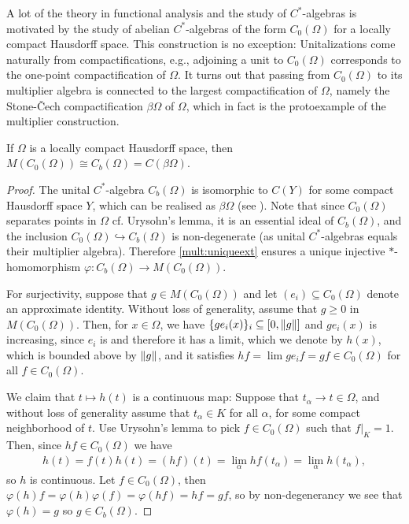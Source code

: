 A lot of the theory in functional analysis and the study of $C^*$-algebras is motivated by the study of abelian $C^*$-algebras of the form $C_0(\Omega)$ for a locally compact Hausdorff space. This construction is no exception: Unitalizations come naturally from compactifications, e.g., adjoining a unit to $C_0(\Omega)$ corresponds to the one-point compactification of $\Omega$. It turns out that passing from $C_0(\Omega)$ to its multiplier algebra is connected to the largest compactification of $\Omega$, namely the Stone-\v{C}ech compactification $\beta \Omega$ of $\Omega$, which in fact is the protoexample of the multiplier construction.
\begin{example}
If $\Omega$ is a locally compact Hausdorff space, then $M(C_0(\Omega))\cong C_b(\Omega) = C(\beta \Omega)$.
\end{example}
\begin{proof}
	The unital $C^*$-algebra $C_b(\Omega)$ is isomorphic to $C(Y)$ for some compact Hausdorff space $Y$, which can be realised as $\beta \Omega$ (see \cite[151]{annow}). Note that since $C_0(\Omega)$ separates points in $\Omega$ cf. Urysohn's lemma, it is an essential ideal of $C_b(\Omega)$, and the inclusion $C_0(\Omega) \hookrightarrow C_b(\Omega)$ is non-degenerate (as unital $C^*$-algebras equals their multiplier algebra). Therefore \ref{mult:uniqueext} ensures a unique injective $*$-homomorphism $\varphi \colon C_b(\Omega) \to M(C_0(\Omega))$. 

	For surjectivity, suppose that $g \in M(C_0(\Omega))$ and let $(e_i) \subseteq C_0(\Omega)$ denote an approximate identity. Without loss of generality, assume that $g \geq 0$ in $M(C_0(\Omega))$. Then, for $x \in \Omega$, we have $\{ge_i(x)\}_i \subseteq [0,\left\lVert g \right\rVert]$ and $ge_i(x)$ is increasing, since $e_i$ is and therefore it has a limit, which we denote by $h(x)$, which is bounded above by $\left\lVert g \right\rVert$, and it satisfies $hf = \lim ge_if =  gf \in C_0(\Omega)$ for all $f \in C_0(\Omega)$.

	We claim that $t \mapsto h(t)$ is a continuous map: Suppose that $t_\alpha \to t \in \Omega$, and without loss of generality assume that $t_\alpha \in K$ for all $\alpha$, for some compact neighborhood of $t$. Use Urysohn's lemma to pick $f \in C_0(\Omega)$ such that $f\big|_K = 1$. Then, since $h f \in C_0(\Omega)$ we have
	\begin{align*}
		h(t)=f(t) h(t) = (hf)(t) = \lim_{\alpha} hf(t_\alpha) = \lim_{\alpha}h(t_\alpha),
	\end{align*}
	so $h$ is continuous. Let $f \in C_0(\Omega)$, then $\varphi(h) f  = \varphi(h) \varphi(f) = \varphi(hf) =  hf = gf$, so by non-degenerancy we see that $\varphi(h) = g$ so $g \in C_b(\Omega)$.
\end{proof}

